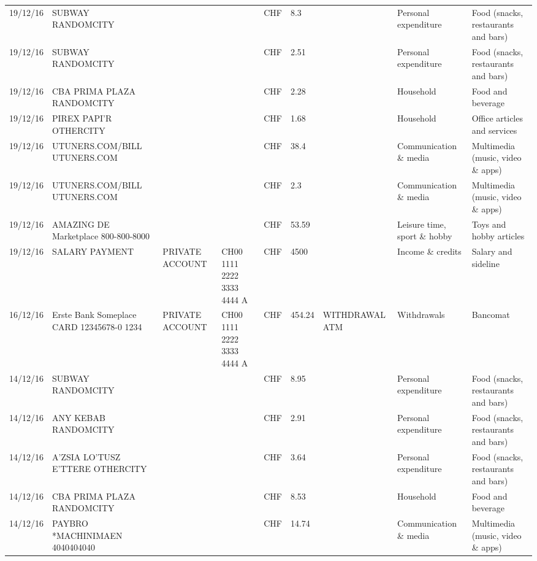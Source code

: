 \begin{landscape}
\begin{center}
\begin{longtable}{lllllllll}
		19/12/16 & SUBWAY                   RANDOMCITY &       &       & CHF   & 8.3   &       & Personal expenditure & Food (snacks, restaurants and bars) \\
		19/12/16 & SUBWAY                   RANDOMCITY &       &       & CHF   & 2.51  &       & Personal expenditure & Food (snacks, restaurants and bars) \\
		19/12/16 & CBA PRIMA PLAZA        RANDOMCITY &       &       & CHF   & 2.28  &       & Household & Food and beverage \\
		19/12/16 & PIREX PAPI'R             OTHERCITY &       &       & CHF   & 1.68  &       & Household & Office articles and services \\
		19/12/16 & UTUNERS.COM/BILL          UTUNERS.COM &       &       & CHF   & 38.4  &       & Communication \& media & Multimedia (music, video \& apps) \\
		19/12/16 & UTUNERS.COM/BILL          UTUNERS.COM &       &       & CHF   & 2.3   &       & Communication \& media & Multimedia (music, video \& apps) \\
		19/12/16 & AMAZING DE Marketplace    800-800-8000 &       &       & CHF   & 53.59 &       & Leisure time, sport \& hobby & Toys and hobby articles \\
		19/12/16 & SALARY PAYMENT & PRIVATE ACCOUNT & CH00 1111 2222 3333 4444 A & CHF   & 4500  &       & Income \& credits & Salary and sideline \\
		16/12/16 & Erste Bank Someplace CARD 12345678-0 1234 & PRIVATE ACCOUNT & CH00 1111 2222 3333 4444 A & CHF   & 454.24 & WITHDRAWAL ATM & Withdrawals & Bancomat \\
		14/12/16 & SUBWAY                   RANDOMCITY &       &       & CHF   & 8.95  &       & Personal expenditure & Food (snacks, restaurants and bars) \\
		14/12/16 & ANY KEBAB            RANDOMCITY &       &       & CHF   & 2.91  &       & Personal expenditure & Food (snacks, restaurants and bars) \\
		14/12/16 & A'ZSIA LO'TUSZ E'TTERE   OTHERCITY &       &       & CHF   & 3.64  &       & Personal expenditure & Food (snacks, restaurants and bars) \\
		14/12/16 & CBA PRIMA PLAZA        RANDOMCITY &       &       & CHF   & 8.53  &       & Household & Food and beverage \\
		14/12/16 & PAYBRO *MACHINIMAEN      4040404040 &       &       & CHF   & 14.74 &       & Communication \& media & Multimedia (music, video \& apps) \\

\end{longtable}
\end{center}
\end{landscape}
